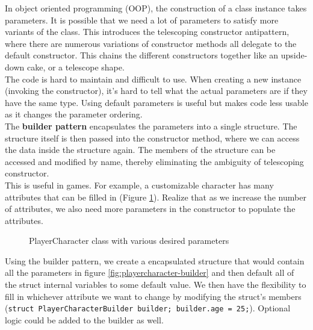 \documentclass[10pt,letterpaper]{article}
\newcommand{\bs}{\bigskip}
\begin{document}
\begin{multicols}{2}
In object oriented programming (OOP), the construction of a class instance takes parameters. It is possible that we need a lot of parameters to satisfy more variants of the class. This introduces the telescoping constructor antipattern\cite{telescopingconstructor}, where there are numerous variations of constructor methods all delegate to the default constructor. This chains the different constructors together like an upside-down cake, or a telescope shape.\bs
\\
The code is hard to maintain and difficult to use. When creating a new instance (invoking the constructor), it's hard to tell what the actual parameters are if they have the same type. Using default parameters is useful but makes code less usable as it changes the parameter ordering.\bs
\\
The \textbf{builder pattern} encapsulates the parameters into a single structure. The structure itself is then passed into the constructor method, where we can access the data inside the structure again. The members of the structure can be accessed and modified by name, thereby eliminating the ambiguity of telescoping constructor.\bs
\\
This is useful in games. For example, a customizable character has many attributes that can be filled in (Figure \ref{fig:playercharacter-1}). Realize that as we increase the number of attributes, we also need more parameters in the constructor to populate the attributes.

\begin{figure}[H]
	\centering


	\caption{PlayerCharacter class with various desired parameters}
	\label{fig:playercharacter-1}
\end{figure}

Using the builder pattern, we create a encapsulated structure that would contain all the parameters in figure \ref{fig:playercharacter-builder} and then default all of the struct internal variables to some default value. We then have the flexibility to fill in whichever attribute we want to change by modifying the struct's members (\texttt{struct PlayerCharacterBuilder builder; builder.age = 25;}). Optional logic could be added to the builder as well.


\end{multicols}
\end{document}
